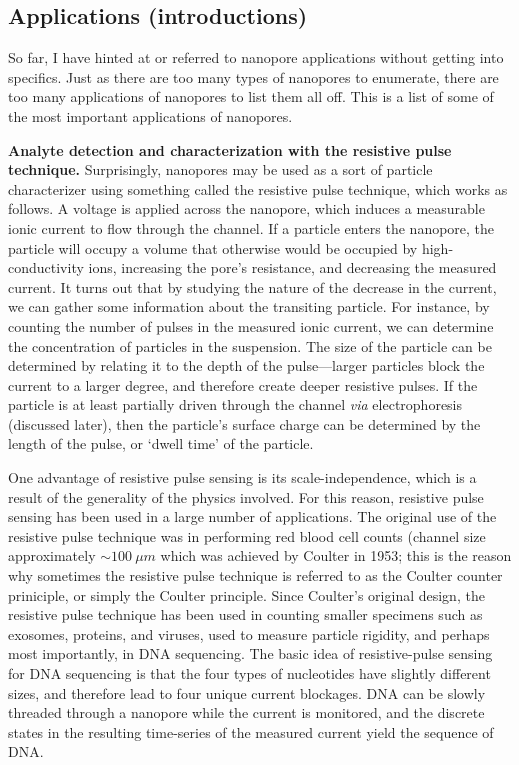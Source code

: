 		\subsection{Applications (introductions)}

			So far, I have hinted at or referred to nanopore applications without getting into specifics. Just as there are too many types of nanopores to enumerate, there are too many applications of nanopores to list them all off. This is a list of some of the most important applications of nanopores.

			\textbf{Analyte detection and characterization with the resistive pulse technique.} Surprisingly, nanopores may be used as a sort of particle characterizer using something called the resistive pulse technique, which works as follows. A voltage is applied across the nanopore, which induces a measurable ionic current to flow through the channel. If a particle enters the nanopore, the particle will occupy a volume that otherwise would be occupied by high-conductivity ions, increasing the pore's resistance, and decreasing the measured current. It turns out that by studying the nature of the decrease in the current, we can gather some information about the transiting particle. For instance, by counting the number of pulses in the measured ionic current, we can determine the concentration of particles in the suspension. The size of the particle can be determined by relating it to the depth of the pulse---larger particles block the current to a larger degree, and therefore create deeper resistive pulses. If the particle is at least partially driven through the channel \textit{via} electrophoresis (discussed later), then the particle's surface charge can be determined by the length of the pulse, or `dwell time' of the particle.

			One advantage of resistive pulse sensing is its scale-independence, which is a result of the generality of the physics involved. For this reason, resistive pulse sensing has been used in a large number of applications. The original use of the resistive pulse technique was in performing red blood cell counts (channel size approximately $\sim\SI{100}{\mu m}$ which was achieved by Coulter in 1953; this is the reason why sometimes the resistive pulse technique is referred to as the Coulter counter priniciple, or simply the Coulter principle. Since Coulter's original design, the resistive pulse technique has been used in counting smaller specimens such as exosomes, proteins, and viruses, used to measure particle rigidity, and perhaps most importantly, in DNA sequencing. The basic idea of resistive-pulse sensing for DNA sequencing is that the four types of nucleotides have slightly different sizes, and therefore lead to four unique current blockages. DNA can be slowly threaded through a nanopore while the current is monitored, and the discrete states in the resulting time-series of the measured current yield the sequence of DNA.

